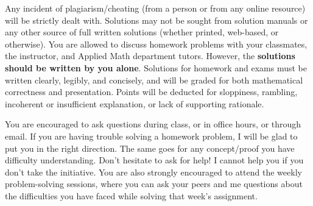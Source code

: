 \documentclass[11pt]{amsart}
\begin{document}
Any incident of plagiarism/cheating (from a person or from any online resource)
will be strictly dealt with.
Solutions may not be sought from solution manuals or any other source of full written solutions (whether printed, web-based, or otherwise). You are allowed to discuss homework problems with your classmates, the instructor, and Applied Math department tutors. However, the \textbf{solutions should be written by you alone}.  Solutions for homework and exams must be written clearly, legibly, and concisely, and will be graded for both mathematical correctness and presentation. Points will be deducted for sloppiness, rambling, incoherent or insufficient explanation, or lack of supporting rationale.


You are encouraged to ask questions during class, or in office hours, or through email.
If you are having trouble solving a homework problem, I will be glad to put you in the right
direction. The same goes for any concept/proof you have difficulty understanding. Don't hesitate
to ask for help! I cannot help you if you don't take the initiative. 
You are also strongly encouraged to attend the weekly problem-solving sessions, where you can ask your peers and me questions about the difficulties you have faced while solving that week's assignment.
\end{document}
